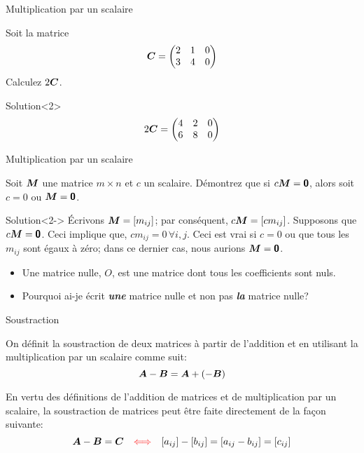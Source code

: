 \documentclass[french]{beamer}
\begin{document}
\begin{frame}{Multiplication par un scalaire}
\begin{example}
    Soit la matrice \[
    \boldsymbol{C} = \begin{pmatrix}
        2 & 1 & 0\\
        3 & 4 & 0
        \end{pmatrix}
    \]
    Calculez $2\boldsymbol{C}$.
\end{example}
\begin{block}{Solution}<2>
\[
    2\boldsymbol{C} = \begin{pmatrix}
        4 & 2 & 0\\
        6 & 8 & 0
        \end{pmatrix}
    \]
    \end{block}
\end{frame}

\begin{frame}{Multiplication par un scalaire}
\begin{example}
	Soit $\boldsymbol{M}$ une matrice $m\times n$ et $c$ un scalaire.  Démontrez que si $c\boldsymbol{M} = \mbox{\textsf{\textbf{{0}}}}$, alors
	soit $c=0$ ou $\boldsymbol{M}=\mbox{\textsf{\textbf{{0}}}}$.
\end{example}
\begin{block}{Solution}<2->
	Écrivons $\boldsymbol{M}=[m_{ij}]$; par conséquent, $c\boldsymbol{M} = [cm_{ij}]$.  Supposons que $c\boldsymbol{M} = \mbox{\textsf{\textbf{{0}}}}$.  Ceci implique que,
	$ cm_{ij}=0\,\forall i, j $.  Ceci est vrai si $c=0$ ou que tous les $m_{ij}$ sont égaux à zéro; dans ce dernier
	cas, nous aurions $\boldsymbol{M}=\mbox{\textsf{\textbf{{0}}}}$.
\end{block}
\begin{itemize}
\item<3-> Une matrice nulle, $O$, est une matrice dont tous les coefficients sont nuls.
\item<4> \alert{Pourquoi ai-je écrit \textit{\textbf{une}} matrice nulle et non pas \textit{\textbf{la}} matrice nulle?}
\end{itemize}
\end{frame}

\begin{frame}{Soustraction}
\begin{definition}
On définit la soustraction de deux matrices
à partir de l'addition et en utilisant la multiplication par un scalaire comme suit:
\[
\boldsymbol{A}-\boldsymbol{B} = \boldsymbol{A} + (-\boldsymbol{B})
\]
\end{definition}

En vertu des définitions de l'addition de matrices et de multiplication par un scalaire, la
soustraction de matrices peut être faite directement de la façon suivante:
\[
\boldsymbol{A} - \boldsymbol{B} = \boldsymbol{C} \quad {\color{red}\Longleftrightarrow} \quad [a_{ij}] - [b_{ij}] = [a_{ij} - b_{ij}] = [c_{ij}]
\]
\end{frame}
\end{document}
